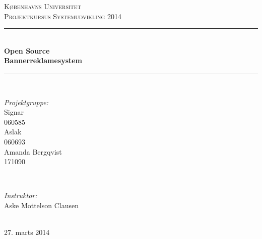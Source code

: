 \documentclass[a4paper,12pt]{article}
\begin{document}
\begin{titlepage}


\newcommand{\HRule}{\rule{\linewidth}{0.5mm}} %

\center %

\textsc{\LARGE Københavns Universitet}\\[1.5cm] %
\textsc{\Large Projektkursus Systemudvikling 2014}\\[0.5cm] %

\HRule \\[0.4cm]
{  \bfseries \large Open Source \\ \huge Bannerreklamesystem}\\[0.4cm] %
\HRule \\[1.5cm]

\begin{minipage}[t]{0.4\textwidth}
\begin{flushleft} \large
\emph{Projektgruppe:}
\newline
\\
Signar %
\\
060585
\newline
\\
Aslak
\\
060693
\newline
\\
Amanda Bergqvist
\\
171090
\end{flushleft}
\end{minipage}
~
\begin{minipage}[t]{0.4\textwidth}
\begin{flushright} \large
\emph{Instruktor:} \\
Aske Mottelson Clausen %
\end{flushright}
\end{minipage}\\[4cm]

{\large 27. marts 2014}\\[3cm] %

\end{titlepage}

\tableofcontents %


\clearpage %
\end{document}
